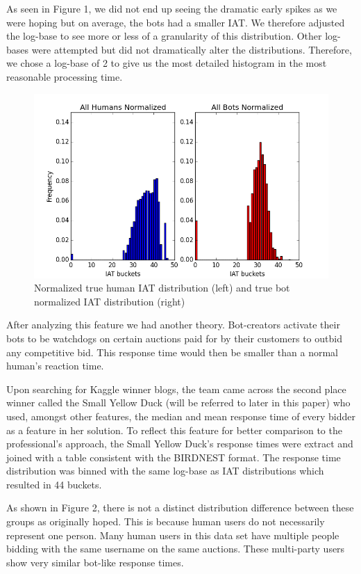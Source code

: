 \documentclass{article} %
\begin{document}
As seen in Figure 1, we did not end up seeing the dramatic early spikes as we were hoping but on average, the bots had a smaller IAT. We therefore adjusted the log-base to see more or less of a granularity of this distribution. Other log-bases were attempted but did not dramatically alter the distributions. Therefore, we chose a log-base of 2 to give us the most detailed histogram in the most reasonable processing time.

\begin{figure}[!htb]
\centering
{\caption{Normalized true human IAT distribution (left) and true bot normalized IAT distribution (right)} \includegraphics[scale=0.5]{img/bird_iat_dist.png}}
\end{figure}

After analyzing this feature we had another theory. Bot-creators activate their bots to be watchdogs on certain auctions paid for by their customers to outbid any competitive bid. This response time would then be smaller than a normal human's reaction time.

Upon searching for Kaggle winner blogs, the team came across the second place winner called the Small Yellow Duck (will be referred to later in this paper) who used, amongst other features, the median and mean response time of every bidder as a feature in her solution. To reflect this feature for better comparison to the professional's approach, the Small Yellow Duck's response times were extract and joined with a table consistent with the BIRDNEST format. The response time distribution was binned with the same log-base as IAT distributions which resulted in 44 buckets.

As shown in Figure 2, there is not a distinct distribution difference between these groups as originally hoped. This is because human users do not necessarily represent one person. Many human users in this data set have multiple people bidding with the same username on the same auctions. These multi-party users show very similar bot-like response times.
\end{document}
